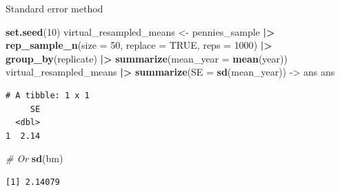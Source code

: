 \documentclass[
  ignorenonframetext,
]{beamer}
\newenvironment{Shaded}{\begin{snugshade}}{\end{snugshade}}
\newcommand{\AttributeTok}[1]{\textcolor[rgb]{0.13,0.29,0.53}{#1}}
\newcommand{\CommentTok}[1]{\textcolor[rgb]{0.56,0.35,0.01}{\textit{#1}}}
\newcommand{\ConstantTok}[1]{\textcolor[rgb]{0.56,0.35,0.01}{#1}}
\newcommand{\DecValTok}[1]{\textcolor[rgb]{0.00,0.00,0.81}{#1}}
\newcommand{\FunctionTok}[1]{\textcolor[rgb]{0.13,0.29,0.53}{\textbf{#1}}}
\newcommand{\NormalTok}[1]{#1}
\newcommand{\OtherTok}[1]{\textcolor[rgb]{0.56,0.35,0.01}{#1}}
\newcommand{\SpecialCharTok}[1]{\textcolor[rgb]{0.81,0.36,0.00}{\textbf{#1}}}
\begin{document}
\begin{frame}[fragile]{Standard error method}
\protect\hypertarget{standard-error-method-1}{}
\small

\begin{Shaded}
\begin{Highlighting}[]
\FunctionTok{set.seed}\NormalTok{(}\DecValTok{10}\NormalTok{)}
\NormalTok{virtual\_resampled\_means }\OtherTok{\textless{}{-}}\NormalTok{ pennies\_sample }\SpecialCharTok{|\textgreater{}} 
  \FunctionTok{rep\_sample\_n}\NormalTok{(}\AttributeTok{size =} \DecValTok{50}\NormalTok{, }\AttributeTok{replace =} \ConstantTok{TRUE}\NormalTok{, }\AttributeTok{reps =} \DecValTok{1000}\NormalTok{) }\SpecialCharTok{|\textgreater{}} 
  \FunctionTok{group\_by}\NormalTok{(replicate) }\SpecialCharTok{|\textgreater{}} 
  \FunctionTok{summarize}\NormalTok{(}\AttributeTok{mean\_year =} \FunctionTok{mean}\NormalTok{(year))}
\NormalTok{virtual\_resampled\_means }\SpecialCharTok{|\textgreater{}} 
  \FunctionTok{summarize}\NormalTok{(}\AttributeTok{SE =} \FunctionTok{sd}\NormalTok{(mean\_year)) }\OtherTok{{-}\textgreater{}}\NormalTok{ ans}
\NormalTok{ans}
\end{Highlighting}
\end{Shaded}

\begin{verbatim}
# A tibble: 1 x 1
     SE
  <dbl>
1  2.14
\end{verbatim}

\begin{Shaded}
\begin{Highlighting}[]
\CommentTok{\# Or}
\FunctionTok{sd}\NormalTok{(bm)}
\end{Highlighting}
\end{Shaded}

\begin{verbatim}
[1] 2.14079
\end{verbatim}
\end{frame}
\end{document}
